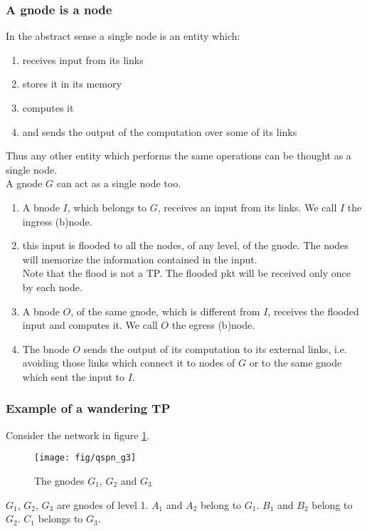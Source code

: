 \documentclass[a4paper]{article}
\begin{document}
\subsubsection{A gnode is a node}
In the abstract sense a single node is an entity which:
\begin{enumerate}
	\item receives input from its links
	\item stores it in its memory
	\item computes it
	\item and sends the output of the computation over some of its links
\end{enumerate}
Thus any other entity which performs the same operations can be thought as a
single node.\\
A gnode $G$ can act as a single node too.
\begin{enumerate}
	\item A bnode $I$, which belongs to $G$, receives an input from its
		links. We call $I$ the ingress (b)node.
	\item this input is flooded to all the nodes, of any level, of the
		gnode. The nodes will memorize the information contained in
		the input.\\
		Note that the flood is not a TP. The flooded pkt will be
		received only once by each node.
	\item A bnode $O$, of the same gnode, which is different from $I$,
		receives the flooded input and computes it.
		We call $O$ the egress (b)node.
	\item The bnode $O$ sends the output of its computation to its
		external links, i.e. avoiding those links which connect it to
		nodes of $G$ or to the same gnode which sent the input to $I$.
\end{enumerate}

\subsubsection{Example of a wandering TP}
Consider the network in figure \ref{fig:qspn_g3}.\\
\begin{figure}[h]
	\begin{center}
		\texttt{[image: fig/qspn\_g3]}
	\end{center}
	\caption{The gnodes $G_1$, $G_2$ and $G_3$}
	\label{fig:qspn_g3}
\end{figure}
$G_1$, $G_2$, $G_3$ are gnodes of level 1. $A_1$ and $A_2$ belong to $G_1$. $B_1$ and $B_2$ belong to
$G_2$. $C_1$ belongs to $G_3$.\\
\end{document}
